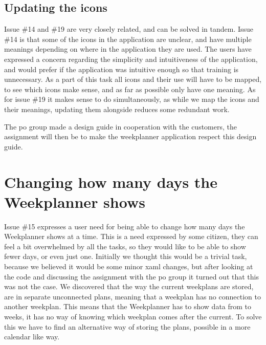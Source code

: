\subsection{Updating the icons}
Issue \#14 and \#19 are very closely related, and can be solved in tandem. Issue \#14 is that some of the icons in the application are unclear, and have multiple meanings depending on where in the application they are used. The users have expressed a concern regarding the simplicity and intuitiveness of the application, and would prefer if the application was intuitive enough so that training is unnecessary.
As a part of this task all icons and their use will have to be mapped, to see which icons make sense, and as far as possible only have one meaning. As for issue \#19 it makes sense to do simultaneously, as while we map the icons and their meanings, updating them alongside reduces some redundant work. 

The \gls{po} group made a design guide in cooperation with the customers, the assignment will then be to make the weekplanner application respect this design guide.

\section{Changing how many days the Weekplanner shows}\label{sec:weekPlannerDaysToShow}

Issue \#15 expresses a user need for being able to change how many days the Weekplanner shows at a time. This is a need expressed by some citizen, they can feel a bit overwhelmed by all the tasks, so they would like to be able to show fewer days, or even just one.
Initially we thought this would be a trivial task, because we believed it would be some minor \gls{xaml} changes, but after looking at the code and discussing the assignment with the \gls{po} group it turned out that this was not the case. We discovered that the way the current weekplans are stored, are in separate unconnected plans, meaning that a weekplan has no connection to another weekplan. This means that the Weekplanner has to show data from to weeks, it has no way of knowing which weekplan comes after the current.
To solve this we have to find an alternative way of storing the plans, possible in a more calendar like way.


